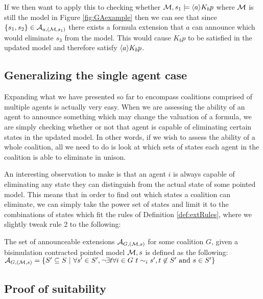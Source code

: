 If we then want to apply this to checking whether $\mathcal{M},s_1 \models \langle a\rangle K_bp$ where $\mathcal{M}$ is still the model in Figure \ref{fig:GAexample} then we can see that since $\{s_1,s_2\}\in\mathcal{A}_{a,(\mathcal{M},s_1)}$ there exists a formula extension that $a$ can announce which would eliminate $s_3$ from the model. This would cause $K_bp$ to be satisfied in the updated model and therefore satisfy $\langle a\rangle K_bp$.

\subsection{Generalizing the single agent case}

Expanding what we have presented so far to encompass coalitions comprised of multiple agents is actually very easy. 
When we are assessing the ability of an agent to announce something which may change the valuation of a formula, we are simply checking whether or not that agent is capable of eliminating certain states in the updated model. In other words, if we wish to assess the ability of a whole coalition, all we need to do is look at which sets of states each agent in the coalition is able to eliminate in unison.

An interesting observation to make is that an agent $i$ is always capable of eliminating any state they can distinguish from the actual state of some pointed model. This means that in order to find out which states a coalition can eliminate, we can simply take the power set of states and limit it to the combinations of states which fit the rules of Definition \ref{def:extRules}, where we slightly tweak rule 2 to the following:

\begin{definition}
	\label{def:extscoal}
	The set of announceable extensions $\mathcal{A}_{G,(\mathcal{M},s)}$ for some coalition $G$, given a bisimulation contracted pointed model $\mathcal{M},s$ is defined as the following: \\
	$\mathcal{A}_{G,(\mathcal{M},s)} = \{S' \subseteq S ~|~ \forall s'\in S', \neg\exists t\forall i\in G ~ t\sim_i s', t\not\in S' \textrm{ and } s\in S'\}$
\end{definition}


\subsection{Proof of suitability}


